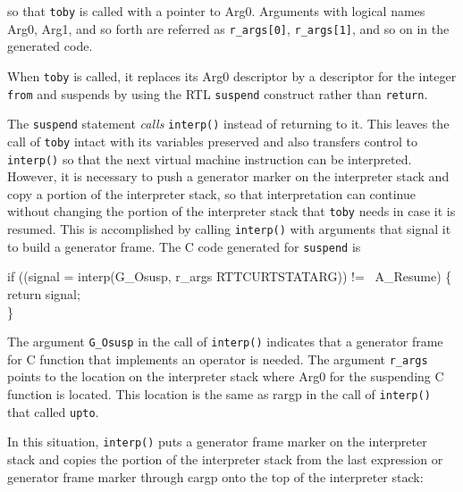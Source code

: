 
\noindent so that \texttt{toby} is called with a pointer to
Arg0. Arguments with logical names Arg0, Arg1, and so forth are
referred as \texttt{r\_args[0]}, \texttt{r\_args[1]}, and so on in the
generated code.

When \texttt{toby} is called, it replaces its Arg0 descriptor by a
descriptor for the integer \texttt{from} and suspends by using the RTL
\texttt{suspend} construct rather than \texttt{return}.

The \texttt{suspend} statement \textit{calls }\texttt{interp()}
instead of returning to it. This leaves the call of \texttt{toby}
intact with its variables preserved and also transfers control to
\texttt{interp()} so that the next virtual machine instruction can be
interpreted. However, it is necessary to push a generator marker on
the interpreter stack and copy a portion of the interpreter stack, so
that interpretation can continue without changing the portion of the
interpreter stack that \texttt{toby} needs in case it is resumed. This
is accomplished by calling \texttt{interp()} with arguments that
signal it to build a generator frame. The C code generated for
\texttt{suspend} is

\begin{iconcode}
\>if ((signal = interp(G\_Osusp, r\_args RTTCURTSTATARG)) != \ A\_Resume) \{\\
\>\>return signal;\\
\>\}
\end{iconcode}

The argument \texttt{G\_Osusp} in the call of \texttt{interp()}
indicates that a generator frame for C function that implements an
operator is needed. The argument \texttt{r\_args} points to the
location on the interpreter stack where Arg0 for the suspending C
function is located. This location is the same as rargp in the call of
\texttt{interp()} that called \texttt{upto}.

In this situation, \texttt{interp()} puts a generator frame marker on
the interpreter stack and copies the portion of the interpreter stack
from the last expression or generator frame marker through cargp onto
the top of the interpreter stack:

